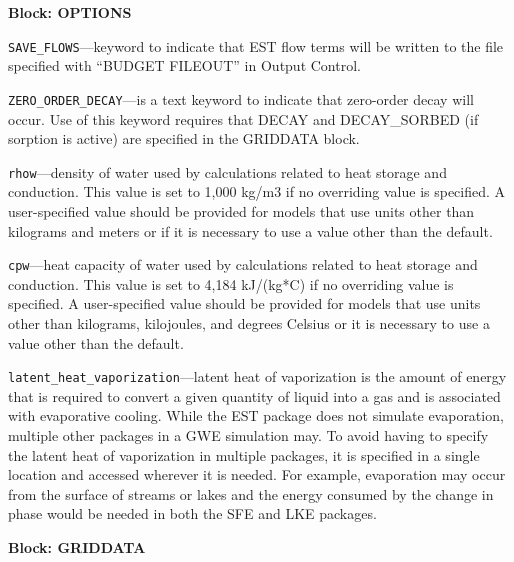 
\item \textbf{Block: OPTIONS}

\begin{description}
\item \texttt{SAVE\_FLOWS}---keyword to indicate that EST flow terms will be written to the file specified with ``BUDGET FILEOUT'' in Output Control.

\item \texttt{ZERO\_ORDER\_DECAY}---is a text keyword to indicate that zero-order decay will occur.  Use of this keyword requires that DECAY and DECAY\_SORBED (if sorption is active) are specified in the GRIDDATA block.

\item \texttt{rhow}---density of water used by calculations related to heat storage and conduction.  This value is set to 1,000 kg/m3 if no overriding value is specified.  A user-specified value should be provided for models that use units other than kilograms and meters or if it is necessary to use a value other than the default.

\item \texttt{cpw}---heat capacity of water used by calculations related to heat storage and conduction.  This value is set to 4,184 kJ/(kg*C) if no overriding value is specified.  A user-specified value should be provided for models that use units other than kilograms, kilojoules, and degrees Celsius or it is necessary to use a value other than the default.

\item \texttt{latent\_heat\_vaporization}---latent heat of vaporization is the amount of energy that is required to convert a given quantity of liquid into a gas and is associated with evaporative cooling.  While the EST package does not simulate evaporation, multiple other packages in a GWE simulation may.  To avoid having to specify the latent heat of vaporization in multiple packages, it is specified in a single location and accessed wherever it is needed.  For example, evaporation may occur from the surface of streams or lakes and the energy consumed by the change in phase would be needed in both the SFE and LKE packages.

\end{description}
\item \textbf{Block: GRIDDATA}

